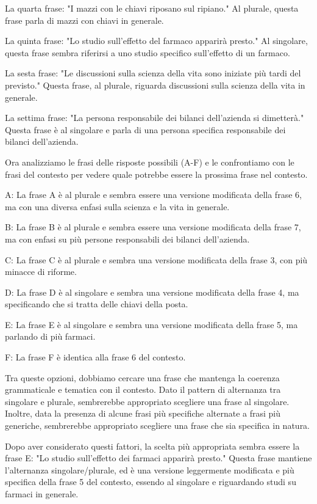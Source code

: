 La quarta frase:
"I mazzi con le chiavi riposano sul ripiano."
Al plurale, questa frase parla di mazzi con chiavi in generale.

La quinta frase:
"Lo studio sull'effetto del farmaco apparirà presto."
Al singolare, questa frase sembra riferirsi a uno studio specifico sull'effetto di un farmaco.

La sesta frase:
"Le discussioni sulla scienza della vita sono iniziate più tardi del previsto."
Questa frase, al plurale, riguarda discussioni sulla scienza della vita in generale.

La settima frase:
"La persona responsabile dei bilanci dell'azienda si dimetterà."
Questa frase è al singolare e parla di una persona specifica responsabile dei bilanci dell'azienda.

Ora analizziamo le frasi delle risposte possibili (A-F) e le confrontiamo con le frasi del contesto per vedere quale potrebbe essere la prossima frase nel contesto.

A: La frase A è al plurale e sembra essere una versione modificata della frase 6, ma con una diversa enfasi sulla scienza e la vita in generale.

B: La frase B è al plurale e sembra essere una versione modificata della frase 7, ma con enfasi su più persone responsabili dei bilanci dell'azienda.

C: La frase C è al plurale e sembra una versione modificata della frase 3, con più minacce di riforme.

D: La frase D è al singolare e sembra una versione modificata della frase 4, ma specificando che si tratta delle chiavi della posta.

E: La frase E è al singolare e sembra una versione modificata della frase 5, ma parlando di più farmaci.

F: La frase F è identica alla frase 6 del contesto.

Tra queste opzioni, dobbiamo cercare una frase che mantenga la coerenza grammaticale e tematica con il contesto. Dato il pattern di alternanza tra singolare e plurale, sembrerebbe appropriato scegliere una frase al singolare. Inoltre, data la presenza di alcune frasi più specifiche alternate a frasi più generiche, sembrerebbe appropriato scegliere una frase che sia specifica in natura.

Dopo aver considerato questi fattori, la scelta più appropriata sembra essere la frase E:
"Lo studio sull'effetto dei farmaci apparirà presto."
Questa frase mantiene l'alternanza singolare/plurale, ed è una versione leggermente modificata e più specifica della frase 5 del contesto, essendo al singolare e riguardando studi su farmaci in generale.

